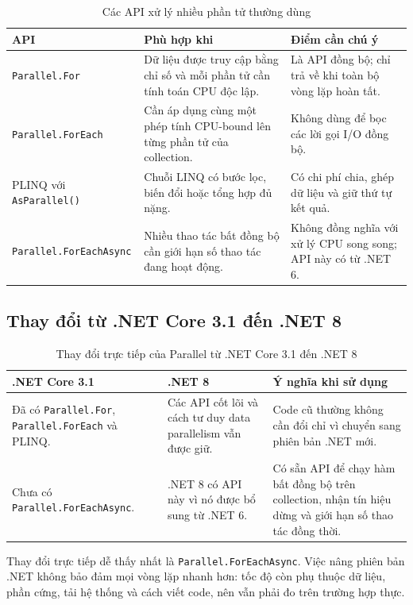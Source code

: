{\small
\begin{longtable}{|>{\raggedright\arraybackslash}p{}|
                  >{\raggedright\arraybackslash}p{}|
                  >{\raggedright\arraybackslash}p{}|}
\caption{Các API xử lý nhiều phần tử thường dùng}\label{tab:parallel-api}\\
\hline
\textbf{API} & \textbf{Phù hợp khi} & \textbf{Điểm cần chú ý} \\
\hline
\texttt{Parallel.For} & Dữ liệu được truy cập bằng chỉ số và mỗi phần tử cần tính toán CPU độc lập. & Là API đồng bộ; chỉ trả về khi toàn bộ vòng lặp hoàn tất. \\
\hline
\texttt{Parallel.ForEach} & Cần áp dụng cùng một phép tính CPU-bound lên từng phần tử của collection. & Không dùng để bọc các lời gọi I/O đồng bộ. \\
\hline
PLINQ với \texttt{AsParallel()} & Chuỗi LINQ có bước lọc, biến đổi hoặc tổng hợp đủ nặng. & Có chi phí chia, ghép dữ liệu và giữ thứ tự kết quả. \\
\hline
\texttt{Parallel.\allowbreak ForEachAsync} & Nhiều thao tác bất đồng bộ cần giới hạn số thao tác đang hoạt động. & Không đồng nghĩa với xử lý CPU song song; API này có từ .NET 6. \\
\hline
\end{longtable}
}

\subsection{Thay đổi từ .NET Core 3.1 đến .NET 8}

{\small
\begin{longtable}{|>{\raggedright\arraybackslash}p{}|
                  >{\raggedright\arraybackslash}p{}|
                  >{\raggedright\arraybackslash}p{}|}
\caption{Thay đổi trực tiếp của Parallel từ .NET Core 3.1 đến .NET 8}\label{tab:parallel-version}\\
\hline
\textbf{.NET Core 3.1} & \textbf{.NET 8} & \textbf{Ý nghĩa khi sử dụng} \\
\hline
Đã có \texttt{Parallel.For}, \texttt{Parallel.ForEach} và PLINQ. & Các API cốt lõi và cách tư duy data parallelism vẫn được giữ. & Code cũ thường không cần đổi chỉ vì chuyển sang phiên bản .NET mới. \\
\hline
Chưa có \texttt{Parallel.ForEachAsync}. & .NET 8 có API này vì nó được bổ sung từ .NET 6. & Có sẵn API để chạy hàm bất đồng bộ trên collection, nhận tín hiệu dừng và giới hạn số thao tác đồng thời. \\
\hline
\end{longtable}
}

Thay đổi trực tiếp dễ thấy nhất là \texttt{Parallel.ForEachAsync}. Việc nâng phiên bản .NET
không bảo đảm mọi vòng lặp nhanh hơn: tốc độ còn phụ thuộc dữ liệu, phần cứng, tải hệ
thống và cách viết code, nên vẫn phải đo trên trường hợp thực.
